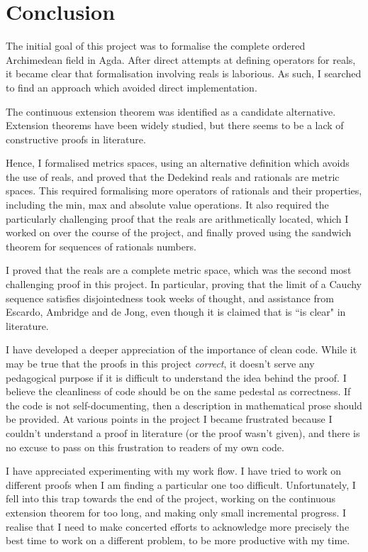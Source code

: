 \documentclass[ProjectReport]{subfiles}
\begin{document}
\section{Conclusion}

The initial goal of this project was to formalise the complete ordered Archimedean field in Agda. After direct attempts at defining operators for reals, it became clear that formalisation involving reals is laborious.  As such, I searched to find an approach which avoided direct implementation.

The continuous extension theorem was identified as a candidate alternative. Extension theorems have been widely studied, but there seems to be a lack of constructive proofs in literature. 

Hence, I formalised metrics spaces, using an alternative definition which avoids the use of reals, and proved that the Dedekind reals and rationals are metric spaces. This required formalising more operators of rationals and their properties, including the min, max and absolute value operations. It also required the particularly challenging proof that the reals are arithmetically located, which I worked on over the course of the project, and finally proved using the sandwich theorem for sequences of rationals numbers.

I proved that the reals are a complete metric space, which was the second most challenging proof in this project. In particular, proving that the limit of a Cauchy sequence satisfies disjointedness took weeks of thought, and assistance from Escardo, Ambridge and de Jong, even though it is claimed that is ``is clear" in literature.

I have developed a deeper appreciation of the importance of clean code. While it may be true that the proofs in this project \textit{correct}, it doesn't serve any pedagogical purpose if it is difficult to understand the idea behind the proof. I believe the cleanliness of code should be on the same pedestal as correctness. If the code is not self-documenting, then a description in mathematical prose should be provided. At various points in the project I became frustrated because I couldn't understand a proof in literature (or the proof wasn't given), and there is no excuse to pass on this frustration to readers of my own code. 

I have appreciated experimenting with my work flow. I have tried to work on different proofs when I am finding a particular one too difficult. Unfortunately, I fell into this trap towards the end of the project, working on the continuous extension theorem for too long, and making only small incremental progress. I realise that I need to make concerted efforts to acknowledge more precisely the best time to work on a different problem, to be more productive with my time.
\end{document}

